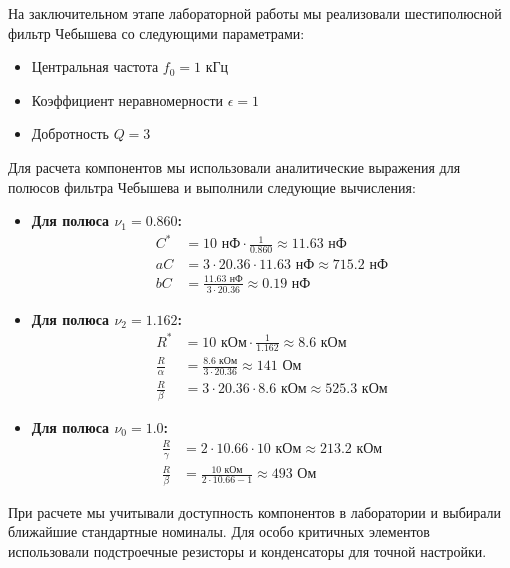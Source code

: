На заключительном этапе лабораторной работы мы реализовали шестиполюсной фильтр Чебышева со следующими параметрами:
\begin{itemize}
    \item Центральная частота $f_0 = 1 \text{ кГц}$
    \item Коэффициент неравномерности $\epsilon = 1$
    \item Добротность $Q = 3$
\end{itemize}

Для расчета компонентов мы использовали аналитические выражения для полюсов фильтра Чебышева и выполнили следующие вычисления:

\begin{itemize}
    \item \textbf{Для полюса \texorpdfstring{$\nu_1 = 0.860$}{nu1 = 0.860}:} 
    \begin{align*}
        C^* &= 10 \text{ нФ} \cdot \frac{1}{0.860} \approx 11.63 \text{ нФ} \\
        aC &= 3 \cdot 20.36 \cdot 11.63 \text{ нФ} \approx 715.2 \text{ нФ} \\
        bC &= \frac{11.63 \text{ нФ}}{3 \cdot 20.36} \approx 0.19 \text{ нФ}
    \end{align*}

    \item \textbf{Для полюса \texorpdfstring{$\nu_2 = 1.162$}{nu2 = 1.162}:} 
    \begin{align*}
        R^* &= 10 \text{ кОм} \cdot \frac{1}{1.162} \approx 8.6 \text{ кОм} \\
        \frac{R}{\alpha} &= \frac{8.6 \text{ кОм}}{3 \cdot 20.36} \approx 141 \text{ Ом} \\
        \frac{R}{\beta} &= 3 \cdot 20.36 \cdot 8.6 \text{ кОм} \approx 525.3 \text{ кОм}
    \end{align*}

    \item \textbf{Для полюса \texorpdfstring{$\nu_0 = 1.0$}{nu0 = 1.0}:} 
    \begin{align*}
        \frac{R}{\gamma} &= 2 \cdot 10.66 \cdot 10 \text{ кОм} \approx 213.2 \text{ кОм} \\
        \frac{R}{\beta} &= \frac{10 \text{ кОм}}{2 \cdot 10.66 - 1} \approx 493 \text{ Ом}
    \end{align*}
\end{itemize}

При расчете мы учитывали доступность компонентов в лаборатории и выбирали ближайшие стандартные номиналы. Для особо критичных элементов использовали подстроечные резисторы и конденсаторы для точной настройки.

